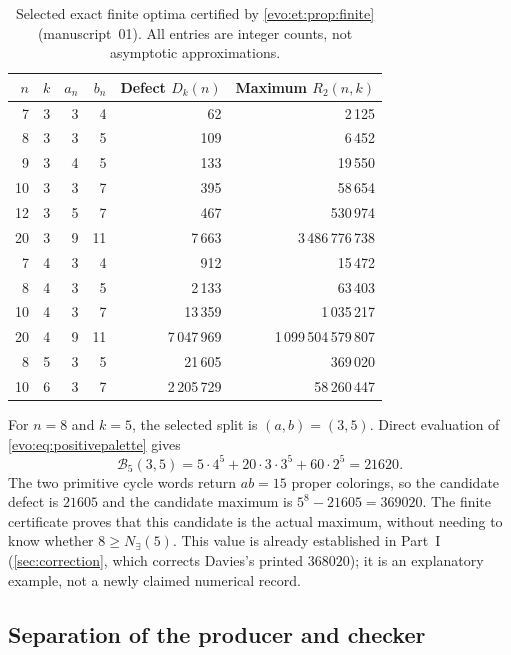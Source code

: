 \documentclass[11pt,a4paper]{article}
\numberwithin{equation}{section}
\theoremstyle{definition}
\theoremstyle{remark}
\newcommand{\Bip}{\mathcal B}
\begin{document}
\begin{table}[htbp]
\centering
\small
\begin{tabular}{@{}rrrrrr@{}}
\toprule
$n$ & $k$ & $a_n$ & $b_n$ & Defect $D_k(n)$ & Maximum $R_2(n,k)$\\
\midrule
7 & 3 & 3 & 4 & 62 & 2\,125\\
8 & 3 & 3 & 5 & 109 & 6\,452\\
9 & 3 & 4 & 5 & 133 & 19\,550\\
10 & 3 & 3 & 7 & 395 & 58\,654\\
12 & 3 & 5 & 7 & 467 & 530\,974\\
20 & 3 & 9 & 11 & 7\,663 & 3\,486\,776\,738\\
7 & 4 & 3 & 4 & 912 & 15\,472\\
8 & 4 & 3 & 5 & 2\,133 & 63\,403\\
10 & 4 & 3 & 7 & 13\,359 & 1\,035\,217\\
20 & 4 & 9 & 11 & 7\,047\,969 & 1\,099\,504\,579\,807\\
8 & 5 & 3 & 5 & 21\,605 & 369\,020\\
10 & 6 & 3 & 7 & 2\,205\,729 & 58\,260\,447\\
\bottomrule
\end{tabular}
\caption{Selected exact finite optima certified by
\cref{evo:et:prop:finite} (manuscript~01). All entries are integer counts,
not asymptotic approximations.}
\label{evo:et:tab:finite}
\end{table}

\begin{example}\label{evo:et:ex:n8k5}
For $n=8$ and $k=5$, the selected split is $(a,b)=(3,5)$. Direct evaluation
of \eqref{evo:eq:positivepalette} gives
\[
 \Bip_5(3,5)=5\cdot4^5+20\cdot3\cdot3^5+60\cdot2^5=21620.
\]
The two primitive cycle words return $ab=15$ proper colorings, so the
candidate defect is $21605$ and the candidate maximum is
$5^8-21605=369020$. The finite certificate proves that this candidate is the
actual maximum, without needing to know whether $8\ge N_\exists(5)$. This
value is already established in Part~I (\cref{sec:correction}, which
corrects Davies's printed $368020$); it is an explanatory example, not a newly
claimed numerical record.
\end{example}

\subsection{Separation of the producer and checker}
\end{document}
